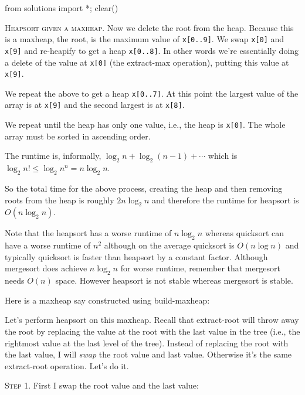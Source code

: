 
\begin{python0}
from solutions import *; clear()
\end{python0}

\textsc{Heapsort given a maxheap.}
Now we delete the root from the heap.
Because this is a maxheap, the root, is the 
maximum value of \verb!x[0..9]!.
We swap \verb!x[0]! and \verb!x[9]!
and re-heapify to get a heap \verb!x[0..8]!.
In other words we're essentially doing a delete of the value at \verb!x[0]!
(the extract-max operation), putting this value at \texttt{x[9]}.

We repeat the above to get a heap \verb!x[0..7]!.
At this point the largest value of the array is at \verb!x[9]!
and the second largest is at \verb!x[8]!.

We repeat until the heap has only one value, i.e., the heap is \verb!x[0]!.
The whole array must be sorted in ascending order.

The runtime is, informally, $\log_2 n + \log_2 (n - 1) + \cdots$
which is $\log_2 n! \leq \log_2 n^n = n \log_2 n$.

So the total time for the above process,
creating the heap and then removing roots from the 
heap is roughly $2 n \log_2 n$ and therefore
the runtime for heapsort is $O(n \log_2 n)$.

Note that the heapsort has a worse runtime of $n \log_2 n$
whereas quicksort can have a worse runtime of $n^2$
although
on the average quicksort is $O(n \log n)$ and 
typically quicksort is faster than heapsort by a constant
factor.
Although mergesort does achieve $n \log_2 n$ for worse runtime,
remember that mergesort needs $O(n)$ space.
However heapsort is not stable whereas mergesort is stable.



\newpage
Here is a maxheap say constructed
using build-maxheap:



Let's perform heapsort on this maxheap.
Recall that extract-root will throw away the root by replacing
the value at the root with the last value in the tree (i.e.,
the rightmost value at the last level of the tree).
Instead of replacing the root with the last value,
I will \textit{swap} the root value and last value.
Otherwise it's the same extract-root operation.
Let's do it.


\textsc{Step 1}.
First I swap the root value and the last value:

